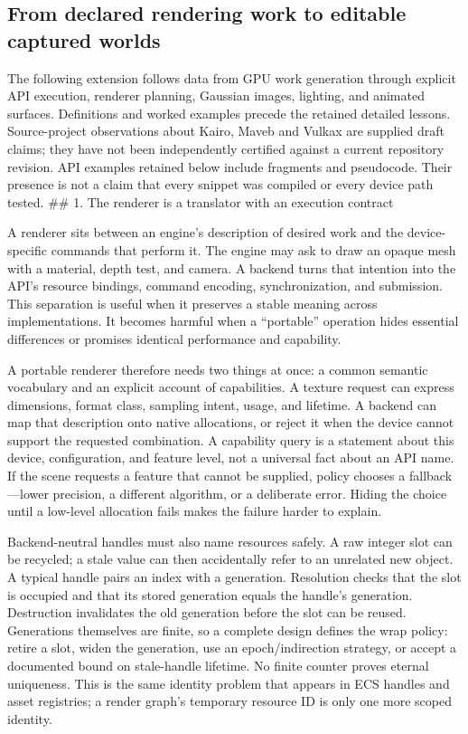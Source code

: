 \subsection{From declared rendering work to editable captured worlds}\label{from-declared-rendering-work-to-editable-captured-worlds}

The following extension follows data from GPU work generation through explicit API execution, renderer planning, Gaussian images, lighting, and animated surfaces. Definitions and worked examples precede the retained detailed lessons. Source-project observations about Kairo, Maveb and Vulkax are supplied draft claims; they have not been independently certified against a current repository revision. API examples retained below include fragments and pseudocode. Their presence is not a claim that every snippet was compiled or every device path tested. \#\# 1. The renderer is a translator with an execution contract

A renderer sits between an engine's description of desired work and the device-specific commands that perform it. The engine may ask to draw an opaque mesh with a material, depth test, and camera. A backend turns that intention into the API's resource bindings, command encoding, synchronization, and submission. This separation is useful when it preserves a stable meaning across implementations. It becomes harmful when a ``portable'' operation hides essential differences or promises identical performance and capability.

A portable renderer therefore needs two things at once: a common semantic vocabulary and an explicit account of capabilities. A texture request can express dimensions, format class, sampling intent, usage, and lifetime. A backend can map that description onto native allocations, or reject it when the device cannot support the requested combination. A capability query is a statement about this device, configuration, and feature level, not a universal fact about an API name. If the scene requests a feature that cannot be supplied, policy chooses a fallback---lower precision, a different algorithm, or a deliberate error. Hiding the choice until a low-level allocation fails makes the failure harder to explain.

Backend-neutral handles must also name resources safely. A raw integer slot can be recycled; a stale value can then accidentally refer to an unrelated new object. A typical handle pairs an index with a generation. Resolution checks that the slot is occupied and that its stored generation equals the handle's generation. Destruction invalidates the old generation before the slot can be reused. Generations themselves are finite, so a complete design defines the wrap policy: retire a slot, widen the generation, use an epoch/indirection strategy, or accept a documented bound on stale-handle lifetime. No finite counter proves eternal uniqueness. This is the same identity problem that appears in ECS handles and asset registries; a render graph's temporary resource ID is only one more scoped identity.

